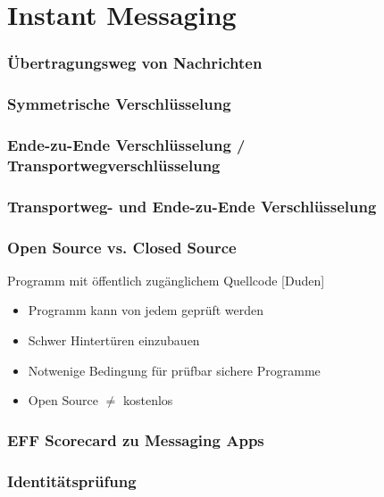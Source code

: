 \section{Instant Messaging}


\begin{frame}
  \frametitle{Übertragungsweg von Nachrichten}
\end{frame}

\begin{frame}
  \frametitle{Symmetrische Verschlüsselung}
\end{frame}

\begin{frame}
  \frametitle{Ende-zu-Ende Verschlüsselung / Transportwegverschlüsselung}
\end{frame}

\begin{frame}
  \frametitle{Transportweg- und Ende-zu-Ende Verschlüsselung}
\end{frame}

\begin{frame}
  \frametitle{Open Source vs. Closed Source}
  \begin{definition}
   Programm mit öffentlich zugänglichem Quellcode \hfill \tiny [Duden]
  \end{definition}

  \begin{itemize}
   \item Programm kann von jedem geprüft werden
   \item Schwer Hintertüren einzubauen
   \item Notwenige Bedingung für prüfbar sichere Programme
   \item Open Source $\neq$ kostenlos
  \end{itemize}

\end{frame}


\begin{frame}
  \frametitle{EFF Scorecard zu Messaging Apps}
\end{frame}

\begin{frame}
  \frametitle{Identitätsprüfung}
\end{frame}